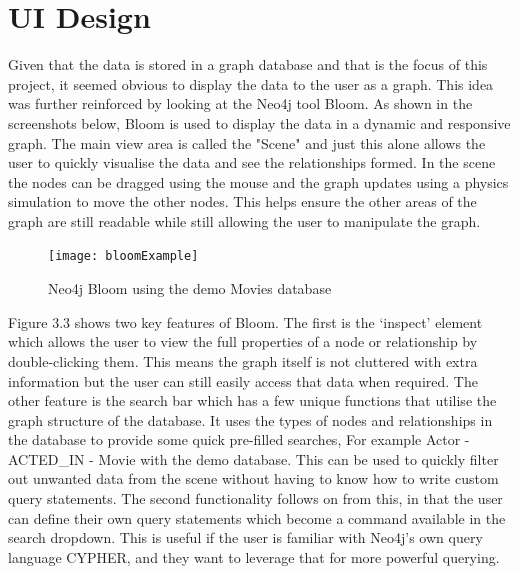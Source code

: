 \section{UI Design}
Given that the data is stored in a graph database and that is the focus of this project, it seemed obvious to display the data 
to the user as a graph. This idea was further reinforced by looking at the Neo4j tool Bloom. As shown in the screenshots below, 
Bloom is used to display the data in a dynamic and responsive graph. The main view area is called the "Scene" and just this alone allows 
the user to quickly visualise the data and see the relationships formed. In the scene the nodes can be dragged using the mouse and the graph updates 
using a physics simulation to move the other nodes. This helps ensure the other areas of the graph are still readable while still allowing the 
user to manipulate the graph.
\begin{figure}[H]
    \centering
    \texttt{[image: bloomExample]}
    \caption{Neo4j Bloom using the demo Movies database}
\end{figure}
Figure 3.3 shows two key features of Bloom. The first is the `inspect' element which allows the user to view the full properties 
of a node or relationship by double-clicking them. This means the graph itself is not cluttered with extra information but the user can 
still easily access that data when required. The other feature is the search bar which has a few unique functions that utilise the 
graph structure of the database. It uses the types of nodes and relationships in the database to provide some quick pre-filled searches, 
For example Actor - ACTED\_IN - Movie with the demo database. This can be used to quickly filter out unwanted data from the scene without having to know 
how to write custom query statements. The second functionality follows on from this, in that the user can define their own query statements which 
become a command available in the search dropdown. This is useful if the user is familiar with Neo4j's own query language CYPHER, and they want 
to leverage that for more powerful querying.
